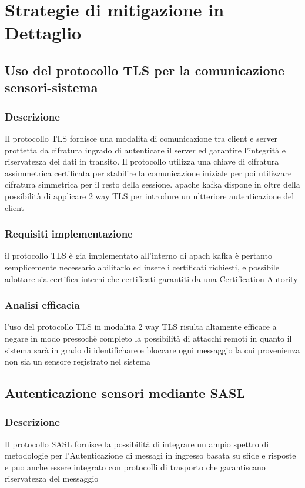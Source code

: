\documentclass[10pt]{article}
\begin{document}
\section{Strategie di mitigazione in Dettaglio}
    \subsection{Uso del protocollo TLS per la comunicazione sensori-sistema}
        \subsubsection{Descrizione}
        Il protocollo TLS fornisce una modalita di comunicazione tra client e server prottetta da cifratura
        ingrado di autenticare il server ed garantire l'integrità e riservatezza dei dati in transito.
        Il protocollo utilizza una chiave di cifratura assimmetrica certificata per stabilire la comunicazione iniziale
        per poi utilizzare cifratura simmetrica per il resto della sessione.
        apache kafka dispone in oltre della possibilità di applicare 2 way TLS per introdure un ultteriore autenticazione del client
        \subsubsection{Requisiti implementazione}
        il protocollo TLS è gia implementato all'interno di apach kafka è pertanto semplicemente necessario abilitarlo ed insere i certificati richiesti,
        e possibile adottare sia certifica interni che certificati garantiti da una Certification Autority
        \subsubsection{Analisi efficacia}
        l'uso del protocollo TLS in modalita 2 way TLS risulta altamente efficace a negare in modo pressochè completo la possibilità di attacchi remoti
        in quanto il sistema sarà in grado di identifichare e bloccare ogni messaggio la cui provenienza non sia un sensore registrato nel sistema
    \subsection{Autenticazione sensori mediante SASL}
        \subsubsection{Descrizione}
        Il protocollo SASL fornisce la possibilità di integrare un ampio spettro di metodologie per l'Autenticazione di messagi in ingresso basata su sfide e risposte e puo anche essere integrato con
        protocolli di trasporto che garantiscano riservatezza del messaggio
\end{document}
